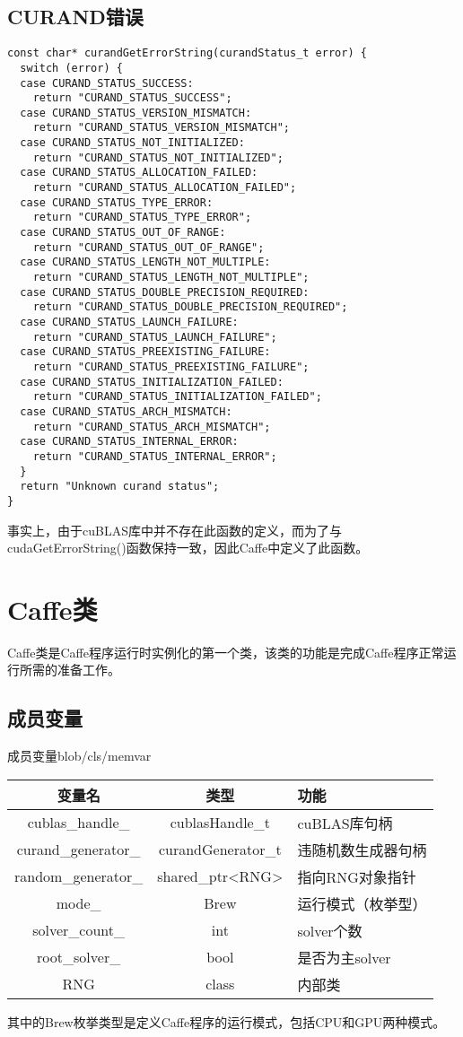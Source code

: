 \subsection{CURAND错误}\label{common/err/curand}
\begin{verbatim}
const char* curandGetErrorString(curandStatus_t error) {
  switch (error) {
  case CURAND_STATUS_SUCCESS:
    return "CURAND_STATUS_SUCCESS";
  case CURAND_STATUS_VERSION_MISMATCH:
    return "CURAND_STATUS_VERSION_MISMATCH";
  case CURAND_STATUS_NOT_INITIALIZED:
    return "CURAND_STATUS_NOT_INITIALIZED";
  case CURAND_STATUS_ALLOCATION_FAILED:
    return "CURAND_STATUS_ALLOCATION_FAILED";
  case CURAND_STATUS_TYPE_ERROR:
    return "CURAND_STATUS_TYPE_ERROR";
  case CURAND_STATUS_OUT_OF_RANGE:
    return "CURAND_STATUS_OUT_OF_RANGE";
  case CURAND_STATUS_LENGTH_NOT_MULTIPLE:
    return "CURAND_STATUS_LENGTH_NOT_MULTIPLE";
  case CURAND_STATUS_DOUBLE_PRECISION_REQUIRED:
    return "CURAND_STATUS_DOUBLE_PRECISION_REQUIRED";
  case CURAND_STATUS_LAUNCH_FAILURE:
    return "CURAND_STATUS_LAUNCH_FAILURE";
  case CURAND_STATUS_PREEXISTING_FAILURE:
    return "CURAND_STATUS_PREEXISTING_FAILURE";
  case CURAND_STATUS_INITIALIZATION_FAILED:
    return "CURAND_STATUS_INITIALIZATION_FAILED";
  case CURAND_STATUS_ARCH_MISMATCH:
    return "CURAND_STATUS_ARCH_MISMATCH";
  case CURAND_STATUS_INTERNAL_ERROR:
    return "CURAND_STATUS_INTERNAL_ERROR";
  }
  return "Unknown curand status";
}
\end{verbatim}
事实上，由于cuBLAS库中并不存在此函数的定义，而为了与cudaGetErrorString()函数保持一致，因此Caffe中定义了此函数。
\section{Caffe类}
Caffe类是Caffe程序运行时实例化的第一个类，该类的功能是完成Caffe程序正常运行所需的准备工作。
\subsection{成员变量}
\begin{cntable}{成员变量}{blob/cls/memvar}
  \begin{tabular}{|c|c|l|}
    \hline
    变量名 & 类型 & 功能 \\ \hline
    cublas\_handle\_ & cublasHandle\_t & cuBLAS库句柄 \\ \hline
    curand\_generator\_ & curandGenerator\_t & 违随机数生成器句柄 \\ \hline
    random\_generator\_ & shared\_ptr<RNG> & 指向RNG对象指针 \\ \hline
    mode\_ & Brew & 运行模式（枚挙型） \\ \hline
    solver\_count\_ & int & solver个数 \\ \hline
    root\_solver\_ & bool & 是否为主solver \\ \hline
    RNG & class & 内部类 \\ \hline
  \end{tabular}
\end{cntable}
其中的Brew枚挙类型是定义Caffe程序的运行模式，包括CPU和GPU两种模式。
